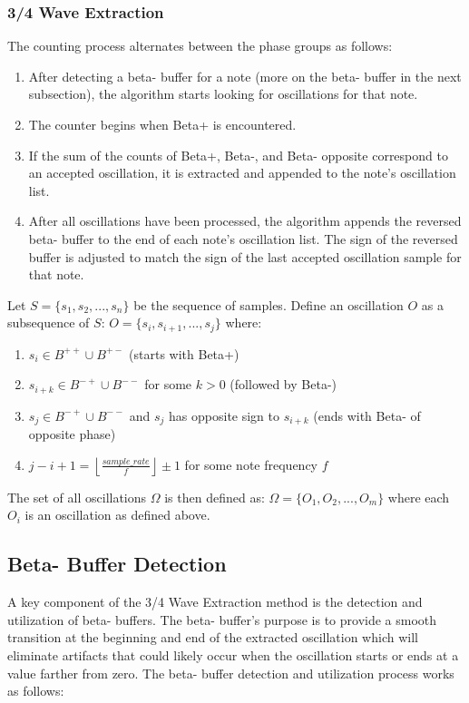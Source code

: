 \documentclass[12pt,a4paper]{article}
\begin{document}
\subsubsection{3/4 Wave Extraction}
\noindent The counting process alternates between the phase groups as follows:
\begin{enumerate}
    \item After detecting a beta- buffer for a note (more on the beta- buffer in the next subsection), the algorithm starts looking for oscillations for that note.
    \item The counter begins when Beta+ is encountered.
    \item If the sum of the counts of Beta+, Beta-, and Beta- opposite correspond to an accepted oscillation, it is extracted and appended to the note's oscillation list.
    \item After all oscillations have been processed, the algorithm appends the reversed beta- buffer to the end of each note's oscillation list. The sign of the reversed buffer is adjusted to match the sign of the last accepted oscillation sample for that note.
\end{enumerate}

Let $S = \{s_1, s_2, ..., s_n\}$ be the sequence of samples. Define an oscillation $O$ as a subsequence of $S$: $O = \{s_i, s_{i+1}, ..., s_j\}$ where:

\begin{enumerate}
\item $s_i \in B^{++} \cup B^{+-}$ (starts with Beta+)
\item $s_{i+k} \in B^{-+} \cup B^{--}$ for some $k > 0$ (followed by Beta-)
\item $s_j \in B^{-+} \cup B^{--}$ and $s_j$ has opposite sign to $s_{i+k}$ (ends with Beta- of opposite phase)
\item $j - i + 1 = \left\lfloor\frac{sample\_rate}{f}\right\rfloor \pm 1$ for some note frequency $f$
\end{enumerate}

The set of all oscillations $\Omega$ is then defined as: $\Omega = \{O_1, O_2, ..., O_m\}$ where each $O_i$ is an oscillation as defined above.

\subsection{Beta- Buffer Detection}
A key component of the 3/4 Wave Extraction method is the detection and utilization of beta- buffers. The beta- buffer's purpose is to provide a smooth transition at the beginning and end of the extracted oscillation which will eliminate artifacts that could likely occur when the oscillation starts or ends at a value farther from zero.
The beta- buffer detection and utilization process works as follows:
\end{document}
